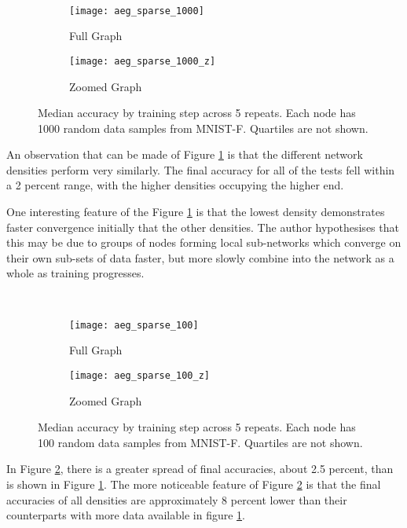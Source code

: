 \begin{figure}[H] 
	 \\
	\begin{subfigure}{0.49\textwidth}
		\texttt{[image: aeg\_sparse\_1000]}
		\caption{Full Graph}
	\end{subfigure}
	\begin{subfigure}{0.49\textwidth}
		\texttt{[image: aeg\_sparse\_1000\_z]}
		\caption{Zoomed Graph}
	\end{subfigure}
	\caption{Median accuracy by training step across 5 repeats. Each node has 1000 random data samples from MNIST-F. Quartiles are not shown.}
	\label{aeg4}
\end{figure}

An observation that can be made of Figure \ref{aeg4} is that the different network densities perform very similarly. The final accuracy for all of the tests fell within a 2 percent range,  with the higher densities occupying the higher end.

One interesting feature of the Figure \ref{aeg4} is that the lowest density demonstrates faster convergence initially that the other densities. The author hypothesises that this may be due to groups of nodes forming local sub-networks which converge on their own sub-sets of data faster, but more slowly combine into the network as a whole as training progresses.

\begin{figure}[H] 
	 \\
	\begin{subfigure}{0.49\textwidth}
		\texttt{[image: aeg\_sparse\_100]}
		\caption{Full Graph}
	\end{subfigure}
	\begin{subfigure}{0.49\textwidth}
		\texttt{[image: aeg\_sparse\_100\_z]}
		\caption{Zoomed Graph}
	\end{subfigure}
	\caption{Median accuracy by training step across 5 repeats. Each node has 100 random data samples from MNIST-F. Quartiles are not shown.}
	\label{aeg5}
\end{figure}

In Figure \ref{aeg5}, there is a greater spread of final accuracies, about 2.5 percent, than is shown in Figure \ref{aeg4}. The more noticeable feature of Figure \ref{aeg5} is that the final accuracies of all densities are approximately 8 percent lower than their counterparts with more data available in figure \ref{aeg4}.

